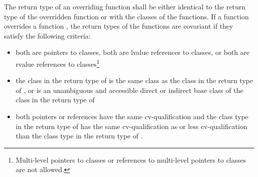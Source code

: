 \pnum
The return type of an overriding function shall be either identical to
the return type of the overridden function or  with
the classes of the functions. If a function  overrides a
function , the return types of the functions are covariant
if they satisfy the following criteria:
\begin{itemize}
\item both are pointers to classes, both are lvalue references to
classes, or both are rvalue references to classes\footnote{Multi-level pointers to classes or references to multi-level pointers to
classes are not allowed.%
}

\item the class in the return type of  is the same class as
the class in the return type of , or is an unambiguous and
accessible direct or indirect base class of the class in the return type
of 

\item both pointers or references have the same cv-qualification and the
class type in the return type of  has the same
cv-qualification as or less cv-qualification than the class type in the
return type of .
\end{itemize}

